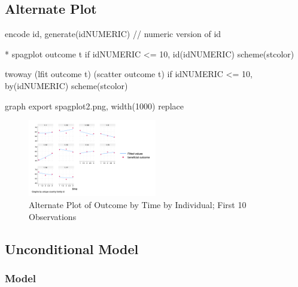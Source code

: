 \documentclass[
  letterpaper,
  DIV=11,
  numbers=noendperiod]{scrreprt}
\newenvironment{Shaded}{\begin{snugshade}}{\end{snugshade}}
\newcommand{\CommentTok}[1]{\textcolor[rgb]{0.37,0.37,0.37}{#1}}
\newcommand{\DecValTok}[1]{\textcolor[rgb]{0.68,0.00,0.00}{#1}}
\newcommand{\KeywordTok}[1]{\textcolor[rgb]{0.00,0.23,0.31}{#1}}
\newcommand{\NormalTok}[1]{\textcolor[rgb]{0.00,0.23,0.31}{#1}}
\begin{document}
\subsection{Alternate Plot}\label{alternate-plot}

\begin{Shaded}
\begin{Highlighting}[]
\KeywordTok{encode}\NormalTok{ id, }\KeywordTok{generate}\NormalTok{(idNUMERIC) }\CommentTok{// numeric version of id}
    
\NormalTok{* spagplot outcome t }\KeywordTok{if}\NormalTok{ idNUMERIC \textless{}= 10, id(idNUMERIC) }\DecValTok{scheme}\NormalTok{(stcolor)}
    
\KeywordTok{twoway}\NormalTok{ (}\KeywordTok{lfit}\NormalTok{ outcome t) (}\KeywordTok{scatter}\NormalTok{ outcome t) }\KeywordTok{if}\NormalTok{ idNUMERIC \textless{}= 10, }\KeywordTok{by}\NormalTok{(idNUMERIC) }\DecValTok{scheme}\NormalTok{(stcolor)}

\KeywordTok{graph} \KeywordTok{export}\NormalTok{ spagplot2.png, }\KeywordTok{width}\NormalTok{(1000) }\KeywordTok{replace}
\end{Highlighting}
\end{Shaded}

\begin{figure}[H]

{\centering \includegraphics[width=0.5\textwidth,height=\textheight]{spagplot2.png}

}

\caption{Alternate Plot of Outcome by Time by Individual; First 10
Observations}

\end{figure}%

\subsection{Unconditional Model}\label{unconditional-model-1}

\subsubsection{Model}\label{model-1}
\end{document}
